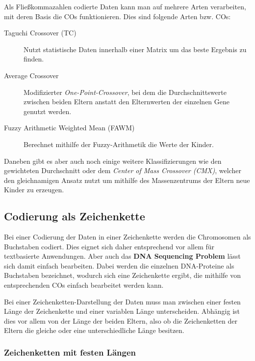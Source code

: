 	Als Fließkommazahlen codierte Daten kann man auf mehrere Arten verarbeiten, mit deren Basis die COs funktionieren. Dies sind \zB folgende Arten bzw. COs:
	
	\begin{description}
		\item[Taguchi Crossover (TC)] Nutzt statistische Daten innerhalb einer Matrix um das beste Ergebnis zu finden. \cite{TaguchiCrossover}
		\item[Average Crossover] Modifizierter \textit{One-Point-Crossover}, bei dem die Durchschnittswerte zwischen beiden Eltern anstatt den Elternwerten der einzelnen Gene genutzt werden. \cite{ConceptOfCOInRealCoded}
		\item[Fuzzy Arithmetic Weighted Mean (FAWM)] Berechnet mithilfe der Fuzzy-Arithmetik die Werte der Kinder. \cite{AirlineRevenueManagement}
	\end{description}
	
	Daneben gibt es aber auch noch einige weitere Klassifizierungen wie \zB den gewichteten Durchschnitt oder dem \textit{Center of Mass Crossover (CMX)}, welcher den gleichnamigen Ansatz nutzt um mithilfe des Massenzentrums der Eltern neue Kinder zu erzeugen. \cite{MultiParentRecombination}

\subsection{Codierung als Zeichenkette}
\label{sec:StrCod}
	
	Bei einer Codierung der Daten in einer Zeichenkette werden die Chromosomen als Buchstaben codiert. Dies eignet sich daher entsprechend vor allem für text\-ba\-sier\-te Anwendungen. Aber auch das \textbf{DNA Sequencing Problem} lässt sich damit einfach bearbeiten. Dabei werden die einzelnen DNA-Proteine als Buchstaben bezeichnet, wodurch sich eine Zeichenkette ergibt, die mithilfe von ent\-sprech\-end\-en COs einfach bearbeitet werden kann. \cite{Survey}
	
	Bei einer Zeichenketten-Darstellung der Daten muss man zwischen einer festen Länge der Zeichenkette und einer variablen Länge unterscheiden. Abhängig ist dies vor allem von der Länge der beiden Eltern, also ob die Zeichenketten der Eltern die gleiche oder eine unterschiedliche Länge besitzen.
	
	\subsubsection{Zeichenketten mit festen Längen}
	
